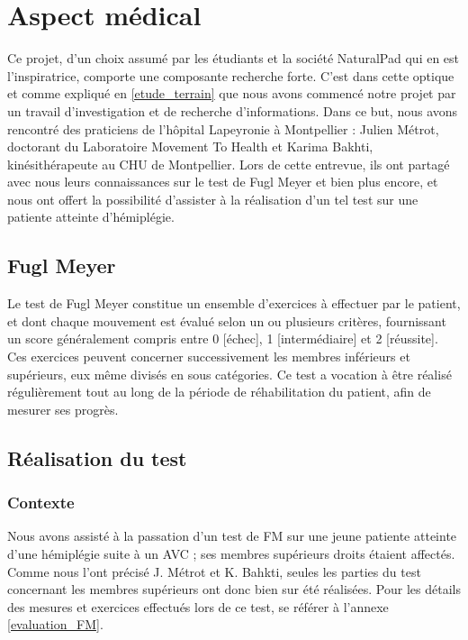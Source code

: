 \documentclass[french,12pt]{report}
\begin{document}
		\section{Aspect médical} \label{lapeyronie}		%
Ce projet, d'un choix assumé par les étudiants et la société NaturalPad qui en est l'inspiratrice, comporte une composante recherche forte. C'est dans cette optique et comme expliqué en \ref{etude_terrain} que nous avons commencé notre projet par un travail d'investigation et de recherche d'informations. Dans ce but, nous avons rencontré des praticiens de l'hôpital Lapeyronie à Montpellier : Julien Métrot, doctorant du Laboratoire Movement To Health et Karima Bakhti, kinésithérapeute au CHU de Montpellier. Lors de cette entrevue, ils ont partagé avec nous leurs connaissances sur le test de Fugl Meyer et bien plus encore, et nous ont offert la possibilité d'assister à la réalisation d'un tel test sur une patiente atteinte d'hémiplégie.
	\subsection{Fugl Meyer}
Le test de Fugl Meyer constitue un ensemble d'exercices à effectuer par le patient, et dont chaque mouvement est évalué selon un ou plusieurs critères, fournissant un score généralement compris entre 0 [échec], 1 [intermédiaire] et 2 [réussite]. Ces exercices peuvent concerner successivement les membres inférieurs et supérieurs, eux même divisés en sous catégories. Ce test a vocation à être réalisé régulièrement tout au long de la période de réhabilitation du patient, afin de mesurer ses progrès.
	\subsection{Réalisation du test}
				\subsubsection{Contexte}
Nous avons assisté à la passation d'un test de FM sur une jeune patiente atteinte d'une hémiplégie suite à un AVC ; ses membres supérieurs droits étaient affectés. Comme nous l'ont précisé J. Métrot et K. Bahkti, seules les parties du test concernant les membres supérieurs ont donc bien sur été réalisées. Pour les détails des mesures et exercices effectués lors de ce test, se référer à l'annexe \ref{evaluation_FM}.
\end{document}
